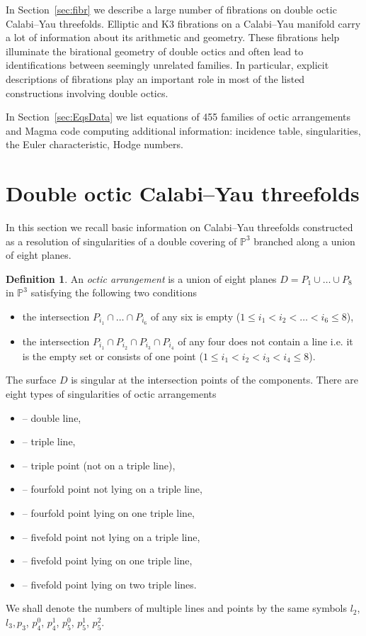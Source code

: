 \documentclass[12pt]{amsart}
\theoremstyle{plain}
\theoremstyle{remark}
\theoremstyle{definition}
\newtheorem{defn}{Definition}[section]
\newcommand{\PP}{\mathbb P}
\numberwithin{table}{section}
\begin{document}
In Section~\ref{sec:fibr} we describe a large number of fibrations on double octic
Calabi--Yau threefolds. Elliptic and K3 fibrations on a Calabi--Yau manifold carry a lot of information about its arithmetic and geometry.  These fibrations help illuminate the birational geometry of double octics and often lead to identifications between seemingly unrelated families. In particular, explicit descriptions of fibrations play an
important role in most of the listed constructions involving double octics.

In Section~\ref{sec:EqsData} we list equations of 455 families of octic arrangements and Magma \cite{Magma} code computing additional information:
incidence table, singularities, the Euler characteristic, Hodge numbers.




\section{Double octic Calabi--Yau threefolds}
In this section we recall basic information on Calabi--Yau
threefolds constructed as a resolution of singularities of a double
covering of $\PP^{3}$ branched along a union of eight planes.
\begin{defn}\label{def:oa}
An \emph{octic arrangement} is a union of eight planes
 $D=P_{1}\cup\dots\cup P_{8}$ in
$\PP^{3}$ satisfying the following two conditions
\begin{itemize}
  \itemsep=2mm
\item the intersection $P_{i_{1}}\cap\dots\cap P_{i_{6}}$ of any six is empty
  ($1\le i_{1}< i_{2}<\dots< i_{6}\le 8$),
\item the intersection $P_{i_{1}}\cap P_{i_{2}}\cap P_{i_{3}}\cap
  P_{i_{4}}$ of any four does not contain a line i.e. it is the  empty
  set or consists of one
  point ($1\le i_{1}< i_{2}< i_{3}< i_{4}\le 8$).
\end{itemize}
\end{defn}
The surface $D$  is singular at the intersection points of the
components. There are eight types of singularities of octic arrangements
\begin{itemize}
\item [$l_{2}$] --  double line,
\item [$l_{3}$] --  triple line,
\item [$p_{3}$] --  triple point (not on a triple line),
\item [$p^{0}_{4}$] --  fourfold point not lying on a triple line,
\item [$p^{1}_{4}$] --  fourfold point lying on  one triple line,
\item [$p^{0}_{5}$] --  fivefold point not lying on a triple line,
\item [$p^{1}_{5}$] --  fivefold point lying on  one triple line,
\item [$p^{2}_{5}$] --  fivefold point lying on  two triple lines.
\end{itemize}
We shall denote the numbers of multiple lines and points by the same symbols
$l_{2}$, $l_{3},p_{3}$, $p_{4}^{0}$, $p_{4}^{1}$, $p_{5}^{0}$, $p_{5}^{1}$, $p_{5}^{2}$.
\end{document}
